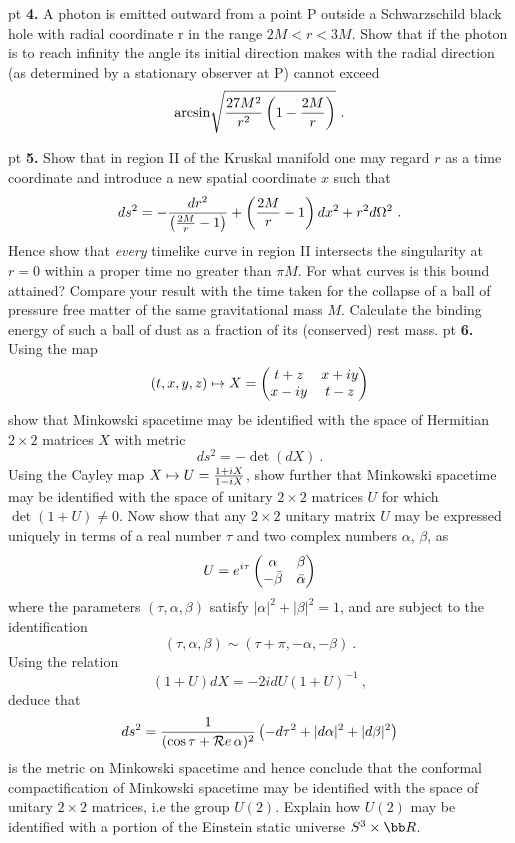  pt
\noindent
{\bf 4.} A photon is emitted outward from a point P outside
a Schwarzschild black hole with radial coordinate r in the range
$2M<r<3M$. Show that if the photon is to reach infinity the angle its
initial direction makes with the radial direction (as determined by 
a stationary observer at P) cannot exceed
$$
{\rm arcsin} \sqrt{{27M^2\over r^2}\left( 1-{2M\over r}\right)}\ .
$$

 pt
\noindent
{\bf 5.} Show that in region II of the Kruskal manifold one may
regard $r$ as a time coordinate and introduce a new spatial
coordinate $x$ such that
$$
ds^2 = -{dr^2\over \left({2M\over r} -1\right)} +\left({2M\over
r}-1\right)dx^2 + r^2d\Omega^2\ .
$$
Hence show that {\it every} timelike
curve in region II intersects the singularity at $r=0$ within a proper
time no greater than $\pi M$. For what curves is this bound attained?
Compare your result with the time taken for the collapse of a ball of
pressure free matter of the same gravitational mass $M$. Calculate
the binding energy of such a ball of dust as a fraction of its
(conserved) rest mass.
 pt
\noindent
{\bf 6.} Using the map
$$
(t,x,y,z) \mapsto X= 
\begin{pmatrix}
t+z & x+iy\cr x-iy & t-z
\end{pmatrix}
$$
show that Minkowski spacetime may be identified with the space of
Hermitian $2\times 2$ matrices $X$ with metric
$$
ds^2 = -\det (dX)\ .
$$
Using the Cayley map $X\mapsto U={1+iX\over1-iX}$, show further that
Minkowski spacetime may be identified with the space of unitary
$2\times 2$ matrices $U$ for which $\det (1+U)\ne0$. Now show that any
$2\times 2$ unitary matrix $U$ may be expressed uniquely in terms of
a real number $\tau$ and two complex numbers $\alpha$, $\beta$, as 
$$
U=e^{i\tau}
\begin{pmatrix}
\alpha & \beta\cr -\bar\beta & \bar\alpha
\end{pmatrix}
$$
where the parameters $(\tau,\alpha,\beta)$ satisfy $|\alpha|^2
+|\beta|^2 =1$, and are subject to the identification 
$$
(\tau,\alpha,\beta) \sim (\tau +\pi, -\alpha, -\beta)\ .
$$
Using the relation
$$
(1+U)dX = -2i dU(1+U)^{-1}\ ,
$$
deduce that 
$$
ds^2 = {1\over (\cos \tau + {\cal R}e\,\alpha)^2}\left(-d\tau^2
+|d\alpha|^2 + |d\beta|^2\right) 
$$
is the metric on Minkowski spacetime and hence conclude that the
conformal compactification of Minkowski spacetime may be identified
with the space of unitary $2\times 2$ matrices, i.e the group
$U(2)$. Explain how $U(2)$ may be identified with a portion of the
Einstein static universe $S^3\times {\bb R}$.

